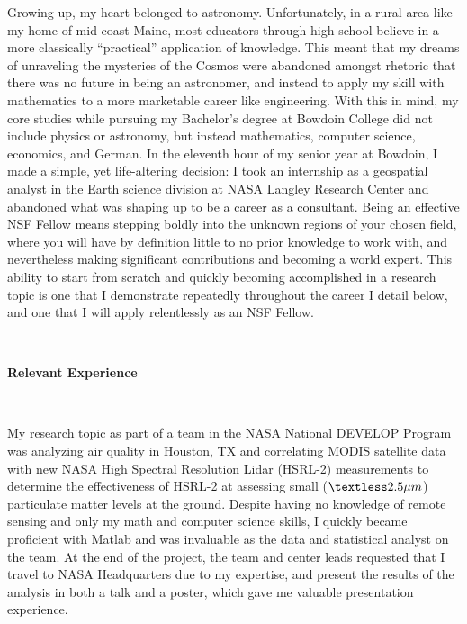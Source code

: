 Growing up, my heart belonged  to astronomy. Unfortunately, in a rural
area  like my  home of  mid-coast Maine,  most educators  through high
school  believe  in  a  more classically  “practical”  application  of
knowledge. This  meant that my  dreams of unraveling the  mysteries of
the Cosmos were abandoned amongst rhetoric that there was no future in
being an astronomer, and instead to apply my skill with mathematics to
a more marketable career like engineering.  With this in mind, my core
studies while pursuing my Bachelor’s degree at Bowdoin College did not
include  physics  or  astronomy,  but  instead  mathematics,  computer
science, economics, and German. In the eleventh hour of my senior year
at Bowdoin,  I made a  simple, yet  life-altering decision: I  took an
internship as  a geospatial analyst  in the Earth science  division at
NASA Langley Research Center and abandoned what was shaping up to be a
career as a consultant.  Being  an effective NSF Fellow means stepping
boldly into the  unknown regions of your chosen field,  where you will
have by  definition little  to no  prior knowledge  to work  with, and
nevertheless  making significant  contributions and  becoming a  world
expert.   This ability  to  start from  scratch  and quickly  becoming
accomplished in a research topic  is one that I demonstrate repeatedly
throughout  the career  I  detail below,  and one  that  I will  apply
relentlessly as an NSF Fellow.

\

\noindent\textbf{Relevant Experience}

\

My  research topic  as part  of a  team in  the NASA  National DEVELOP
Program was analyzing air quality in Houston, TX and correlating MODIS
satellite data with  new NASA High Spectral  Resolution Lidar (HSRL-2)
measurements  to determine  the effectiveness  of HSRL-2  at assessing
small  ($\textless2.5\mu   m$)  particulate   matter  levels   at  the
ground. Despite having no knowledge of remote sensing and only my math
and computer science  skills, I quickly became  proficient with Matlab
and was  invaluable as the data  and statistical analyst on  the team.
At the end of the project, the  team and center leads requested that I
travel  to NASA  Headquarters due  to  my expertise,  and present  the
results of  the analysis in  both a talk and  a poster, which  gave me
valuable presentation experience.


